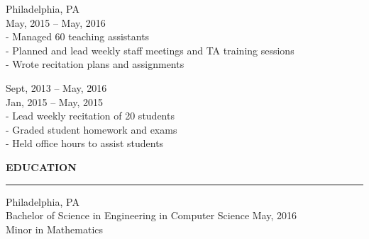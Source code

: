 \documentclass{resume} %
\begin{document}

\hspace*{1mm}{\bf Computer and Information Science Department, University of Pennsylvania } \hfill Philadelphia, PA \\
\hspace*{1mm}{\em Head Teaching Assistant, Introduction to Computer Programming } \hfill May, 2015 -- May, 2016\\
\hspace*{3mm}- Managed 60 teaching assistants \\
\hspace*{3mm}- Planned and lead weekly staff meetings and TA training sessions \\
\hspace*{3mm}- Wrote recitation plans and assignments


\hspace*{1mm}{\em Teaching Assistant, Introduction to Computer Programming } \hfill Sept, 2013 -- May, 2016\\
\hspace*{1mm}{\em Teaching Assistant, JavaScript } \hfill Jan, 2015 -- May, 2015 \\
\hspace*{3mm}- Lead weekly recitation of 20 students \\
\hspace*{3mm}- Graded student homework and exams \\
\hspace*{3mm}- Held office hours to assist students


\medskip
\MakeUppercase{\bf Education}
\medskip
\hrule

\hspace*{1mm}{\bf University of Pennsylvania} \hfill Philadelphia, PA \\
\hspace*{1mm}Bachelor of Science in Engineering in Computer Science \hfill May, 2016 \\
\hspace*{1mm}Minor in Mathematics
\end{document}
